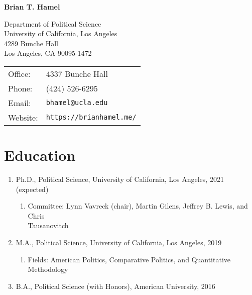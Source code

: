 \documentclass[11pt]{article}
\def\name{\textbf{Brian T. Hamel}}
\begin{document}
{\huge \name}


\vspace{0.25in}

\begin{minipage}{0.5\linewidth}
  Department of Political Science \\
  University of California, Los Angeles \\
  4289 Bunche Hall \\
  Los Angeles, CA 90095-1472 
\end{minipage}
\begin{minipage}{0.5\linewidth}
  \begin{tabular}{ll}
    Office: & 4337 Bunche Hall \\
    Phone: & (424) 526-6295 \\
    Email: & \texttt{bhamel@ucla.edu} \\
    Website: & \texttt{https://brianhamel.me/} \\
  \end{tabular}
\end{minipage}

\section*{Education}

\begin{enumerate}[topsep = 0pt, itemsep = 1ex, partopsep  = 1ex, parsep = 1ex]

	\item[] Ph.D., Political Science, University of California, Los Angeles, 2021 (expected)
	
	\begin{enumerate}[topsep = 0pt, itemsep = -1ex, partopsep = -1ex, parsep = 1ex]
		
		\item[] Committee: Lynn Vavreck (chair), Martin Gilens, Jeffrey B. Lewis, and Chris \\ Tausanovitch
	
	\end{enumerate}
		
	\item[] M.A., Political Science, University of California, Los Angeles, 2019
	
	\begin{enumerate}[topsep = 0pt, itemsep = -1ex, partopsep  = -1ex, parsep = 1ex]
	
		\item[] Fields: American Politics, Comparative Politics, and Quantitative Methodology
	
	\end{enumerate}
		
	\item[] B.A., Political Science (with Honors), American University, 2016

\end{enumerate}
\end{document}
